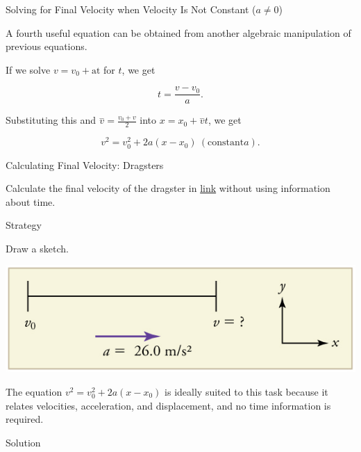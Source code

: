\documentclass[
]{book}
\newenvironment{tinysection}{}{}
\newenvironment{note}{}{}
\begin{document}
\hypertarget{fs-id1164906460433}{}
\begin{note}

Solving for Final Velocity when Velocity Is Not Constant (\(a \neq 0\))

A fourth useful equation can be obtained from another algebraic
manipulation of previous equations.

If we solve \({v = {v_{0} + \text{at}}}{}\) for \(t{}\), we get

\leavevmode\hypertarget{import-auto-id2365760}{}%
\[{{t = \frac{v - v_{0}}{a}}\text{.}}{}\]

Substituting this and \({\overset{-}{v} = \frac{v_{0} + v}{2}}{}\) into
\({{x = {x_{0} + \overset{-}{v}}}t}{}\), we get

\leavevmode\hypertarget{import-auto-id1659227}{}%
\[{v^{2} = {v_{0}^{2} + 2a}}\left( {x - x_{0}} \right)\ (\text{constant} a)\text{.}\]

\end{note}

\hypertarget{fs-id1164906443776}{}
Calculating Final Velocity: Dragsters

Calculate the final velocity of the dragster in
\protect\hyperlink{fs-id1164906457202}{link} without using
information about time.

\begin{tinysection}

{Strategy}

\end{tinysection}

Draw a sketch.

\includegraphics{images/Figure_02_04_02b.jpg}

The equation \({{v^{2} = {v_{0}^{2} + 2a}}({x - x_{0}})}{}\) is ideally
suited to this task because it relates velocities, acceleration, and
displacement, and no time information is required.

\begin{tinysection}

{Solution}

\end{tinysection}
\end{document}
